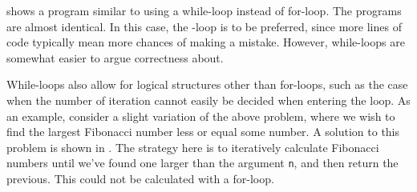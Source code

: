 \documentclass[fsharpNotes.tex]{subfiles}
\begin{document}
 shows a program similar to  using a while-loop instead of for-loop.
%
%
The programs are almost identical. In this case, the -loop is to be preferred, since more lines of code typically mean more chances of making a mistake.  However, while-loops are somewhat easier to argue correctness about.

While-loops also allow for logical structures other than for-loops, such as the case when the number of iteration cannot easily be decided when entering the loop. As an example, consider a slight variation of the above problem, where we wish to find the largest Fibonacci number less or equal some number. A solution to this problem is shown in .
%
%
The strategy here is to iteratively calculate Fibonacci numbers until we've found one larger than the argument \lstinline{n}, and then return the previous. This could not be calculated with a for-loop.
\end{document}
